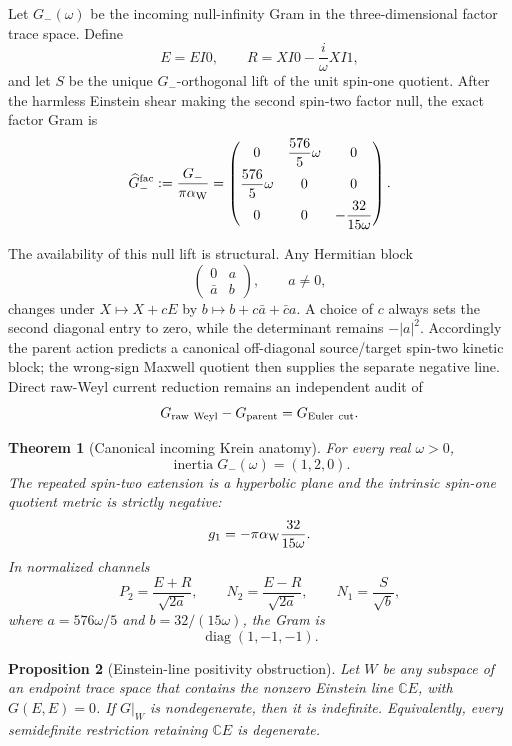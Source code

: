 \documentclass[11pt]{article}
\newtheorem{theorem}{Theorem}[section]
\newtheorem{proposition}[theorem]{Proposition}
\theoremstyle{definition}
\theoremstyle{remark}
\newcommand{\C}{\mathbb C}
\newcommand{\inertia}{\operatorname{inertia}}
\begin{document}
Let \(G_-(\omega)\) be the incoming null-infinity Gram in the three-dimensional
factor trace space.  Define
\[
E=EI0,\qquad
R=XI0-\frac{i}{\omega}XI1,
\]
and let \(S\) be the unique \(G_-\)-orthogonal lift of the unit spin-one
quotient.  After the harmless Einstein shear making the second spin-two
factor null, the exact factor Gram is
\begin{equation}
\label{eq:factor-gram}
\widehat G_-^{\rm fac}
:=\frac{G_-}{\pi\alpha_{\rm W}}
=
\begin{pmatrix}
0&\dfrac{576}{5}\omega&0\\[2mm]
\dfrac{576}{5}\omega&0&0\\[2mm]
0&0&-\dfrac{32}{15\omega}
\end{pmatrix}.
\end{equation}

The availability of this null lift is structural.  Any Hermitian block
\[
\begin{pmatrix}0&a\\ \bar a&b\end{pmatrix},
\qquad a\ne0,
\]
changes under \(X\mapsto X+cE\) by
\(b\mapsto b+c\bar a+\bar c a\).  A choice of \(c\) always sets the second
diagonal entry to zero, while the determinant remains \(-|a|^2\).
Accordingly the parent action predicts a canonical off-diagonal
source/target spin-two kinetic block; the wrong-sign Maxwell quotient then
supplies the separate negative line.  Direct raw-Weyl current reduction
remains an independent audit of
\[
G_{\rm raw\ Weyl}-G_{\rm parent}=G_{\rm Euler\ cut}.
\]

\begin{theorem}[Canonical incoming Krein anatomy]
\label{thm:krein}
For every real \(\omega>0\),
\[
\inertia G_-(\omega)=(1,2,0).
\]
The repeated spin-two extension is a hyperbolic plane and the intrinsic
spin-one quotient metric is strictly negative:
\[
g_1=-\pi\alpha_{\rm W}\frac{32}{15\omega}.
\]
In normalized channels
\[
P_2=\frac{E+R}{\sqrt{2a}},\qquad
N_2=\frac{E-R}{\sqrt{2a}},\qquad
N_1=\frac{S}{\sqrt b},
\]
where \(a=576\omega/5\) and \(b=32/(15\omega)\), the Gram is
\[
\operatorname{diag}(1,-1,-1).
\]
\end{theorem}

\begin{proposition}[Einstein-line positivity obstruction]
\label{prop:positivity-trilemma}
Let \(W\) be any subspace of an endpoint trace space that contains the
nonzero Einstein line \(\C E\), with \(G(E,E)=0\).  If \(G|_W\) is
nondegenerate, then it is indefinite.  Equivalently, every semidefinite
restriction retaining \(\C E\) is degenerate.
\end{proposition}
\end{document}
